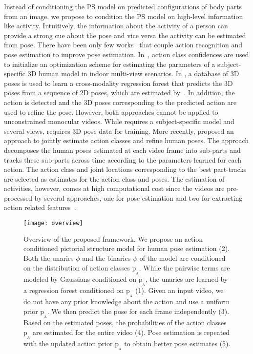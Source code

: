 \documentclass[a4paper, 10pt, conference]{ieeeconf}      \usepackage{FG2017}
\begin{document}
Instead of conditioning the PS model on predicted configurations of body parts from an image, we propose to condition the PS model on high-level information like activity.   
Intuitively, the information about the activity of a person can provide a strong cue about the pose and vice versa the activity can be estimated from pose. There have been only few works~\cite{yao_ijcv2012,Yu_cvpr2013,bruce_cvpr2015} that couple action recognition and pose estimation to improve pose estimation. In~\cite{yao_ijcv2012}, action class confidences are used to initialize an optimization scheme for estimating the parameters of a subject-specific 3D human model in indoor multi-view scenarios. In \cite{Yu_cvpr2013}, a database of 3D poses is used to learn a cross-modality regression forest that predicts the 3D poses from a sequence of 2D poses, which are estimated by~\cite{yang_tpami2014}. In addition, the action is detected and the 3D poses corresponding to the predicted action are used to refine the pose. However, both approaches cannot be applied to unconstrained monocular videos. While \cite{yao_ijcv2012} requires a subject-specific model and several views, \cite{Yu_cvpr2013} requires 3D pose data for training. More recently, \cite{bruce_cvpr2015} proposed an approach to jointly estimate action classes and refine human poses. The approach decomposes the human poses estimated at each video frame into sub-parts and tracks these sub-parts across time according to the parameters learned for each action. The action class and joint locations corresponding to the best part-tracks are selected as estimates for the action class and poses. 
The estimation of activities, however, comes at high computational cost since the videos are pre-processed by several approaches, one for pose estimation \cite{park_iccv2011} and two for extracting action related features~\cite{wang:2011,wang2014cross}. 

\begin{figure*}[t!]
\centering
\captionsetup[figure]{skip=0pt}
\texttt{[image: overview]}
\caption{Overview of the proposed framework. We propose an action conditioned pictorial structure model for human pose estimation (2). Both the unaries $\phi$ and the binaries $\psi$ of the model are conditioned on the distribution of action classes $\mathrm{p_{_A}}$. While the pairwise terms are modeled by Gaussians conditioned on $\mathrm{p_{_A}}$, the unaries are learned by a regression forest conditioned on $\mathrm{p_{_A}}$ (1). Given an input video, we do not have any prior knowledge about the action and use a uniform prior $\mathrm{p_{_A}}$. We then predict the pose for each frame independently (3). Based on the estimated poses, the probabilities of the action classes $\mathrm{p_{_A}}$ are estimated for the entire video (4). Pose estimation is repeated with the updated action prior $\mathrm{p_{_A}}$ to obtain better pose estimates (5).}
  \vspace{-4mm}
\label{fig:overview}
\end{figure*}
\end{document}
